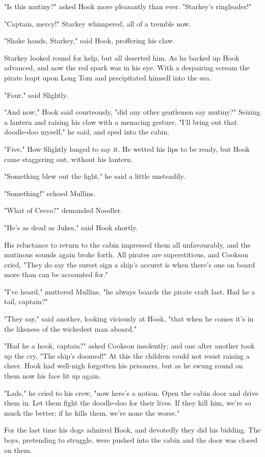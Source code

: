 "Is this mutiny?" asked Hook more pleasantly than ever. "Starkey's
ringleader!"


"Captain, mercy!" Starkey whimpered, all of a tremble now.


"Shake hands, Starkey," said Hook, proffering his claw.


Starkey looked round for help, but all deserted him. As he backed up Hook
advanced, and now the red spark was in his eye. With a despairing scream
the pirate leapt upon Long Tom and precipitated himself into the sea.


"Four," said Slightly.


"And now," Hook said courteously, "did any other gentlemen say mutiny?"
Seizing a lantern and raising his claw with a menacing gesture, "I'll
bring out that doodle-doo myself," he said, and sped into the cabin.


"Five." How Slightly longed to say it. He wetted his lips to be ready, but
Hook came staggering out, without his lantern.


"Something blew out the light," he said a little unsteadily.


"Something!" echoed Mullins.


"What of Cecco?" demanded Noodler.


"He's as dead as Jukes," said Hook shortly.


His reluctance to return to the cabin impressed them all unfavourably, and
the mutinous sounds again broke forth. All pirates are superstitious, and
Cookson cried, "They do say the surest sign a ship's accurst is when
there's one on board more than can be accounted for."


"I've heard," muttered Mullins, "he always boards the pirate craft last.
Had he a tail, captain?"


"They say," said another, looking viciously at Hook, "that when he comes
it's in the likeness of the wickedest man aboard."


"Had he a hook, captain?" asked Cookson insolently; and one after another
took up the cry, "The ship's doomed!" At this the children could not
resist raising a cheer. Hook had well-nigh forgotten his prisoners, but as
he swung round on them now his face lit up again.


"Lads," he cried to his crew, "now here's a notion. Open the cabin door
and drive them in. Let them fight the doodle-doo for their lives. If they
kill him, we're so much the better; if he kills them, we're none the
worse."


For the last time his dogs admired Hook, and devotedly they did his
bidding. The boys, pretending to struggle, were pushed into the cabin and
the door was closed on them.


